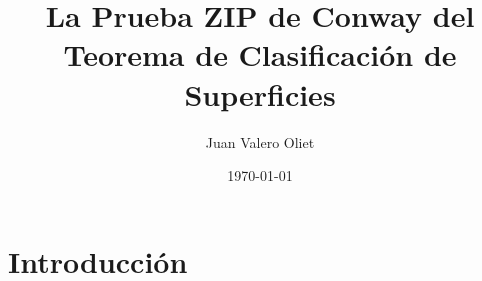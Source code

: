 \documentclass{beamer}
\title[Trabajo de Fin de Grado]{La Prueba ZIP de Conway del Teorema de Clasificación de Superficies} %
\author{Juan Valero Oliet} %
\institute[UCM] %
{
Universidad Complutense de Madrid \\ %
\medskip
\textit{Dirigido por: Manuel Alonso Morón} %
}
\date{\today} %
\theoremstyle{definition}
\begin{document}
\begin{frame}
\titlepage %
\end{frame}



\section{Introducción} %

\end{document}
